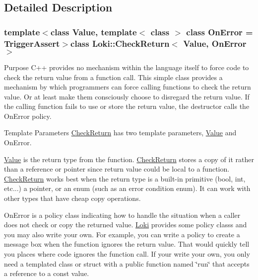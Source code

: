 \subsection{Detailed Description}
\subsubsection*{template$<$class Value, template$<$ class $>$ class On\+Error = Trigger\+Assert$>$class Loki\+::\+Check\+Return$<$ Value, On\+Error $>$}

\begin{DoxyParagraph}{Purpose}
C++ provides no mechanism within the language itself to force code to check the return value from a function call. This simple class provides a mechanism by which programmers can force calling functions to check the return value. Or at least make them consciously choose to disregard the return value. If the calling function fails to use or store the return value, the destructor calls the On\+Error policy.
\end{DoxyParagraph}
\begin{DoxyParagraph}{Template Parameters}
\hyperlink{classLoki_1_1CheckReturn}{Check\+Return} has two template parameters, \hyperlink{structValue}{Value} and On\+Error.
\begin{DoxyItemize}
\item \hyperlink{structValue}{Value} is the return type from the function. \hyperlink{classLoki_1_1CheckReturn}{Check\+Return} stores a copy of it rather than a reference or pointer since return value could be local to a function. \hyperlink{classLoki_1_1CheckReturn}{Check\+Return} works best when the return type is a built-\/in primitive (bool, int, etc...) a pointer, or an enum (such as an error condition enum). It can work with other types that have cheap copy operations.
\item On\+Error is a policy class indicating how to handle the situation when a caller does not check or copy the returned value. \hyperlink{namespaceLoki}{Loki} provides some policy classs and you may also write your own. For example, you can write a policy to create a message box when the function ignores the return value. That would quickly tell you places where code ignores the function call. If your write your own, you only need a templated class or struct with a public function named \char`\"{}run\char`\"{} that accepts a reference to a const value.
\end{DoxyItemize}
\end{DoxyParagraph}
